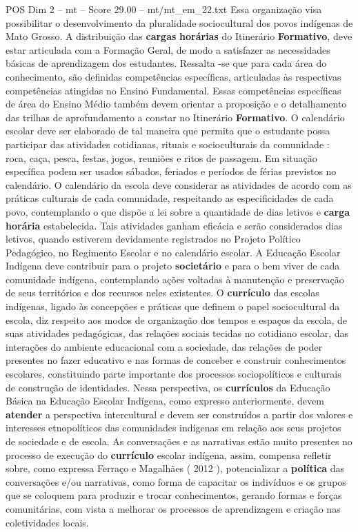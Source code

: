 \begin{textsample}{POS Dim 2 – mt – Score 29.00 – mt/mt\_em\_22.txt}
Essa organização visa possibilitar o desenvolvimento da pluralidade sociocultural dos povos indígenas de Mato Grosso.
A distribuição das \textbf{cargas} \textbf{horárias} do Itinerário \textbf{Formativo}, deve estar articulada com a Formação Geral, de modo a satisfazer as necessidades básicas de aprendizagem dos estudantes.
Ressalta -se que para cada área do conhecimento, são definidas competências específicas, articuladas às respectivas competências atingidas no Ensino Fundamental.
Essas competências específicas de área do Ensino Médio também devem orientar a proposição e o detalhamento das trilhas de aprofundamento a constar no Itinerário \textbf{Formativo}.
O calendário escolar deve ser elaborado de tal maneira que permita que o estudante possa participar das atividades cotidianas, rituais e socioculturais da comunidade : roca, caça, pesca, festas, jogos, reuniões e ritos de passagem.
Em situação específica podem ser usados sábados, feriados e períodos de férias previstos no calendário.
O calendário da escola deve considerar as atividades de acordo com as práticas culturais de cada comunidade, respeitando as especificidades de cada povo, contemplando o que dispõe a lei sobre a quantidade de dias letivos e \textbf{carga} \textbf{horária} estabelecida.
Tais atividades ganham eficácia e serão considerados dias letivos, quando estiverem devidamente registrados no Projeto Político Pedagógico, no Regimento Escolar e no calendário escolar.
A Educação Escolar Indígena deve contribuir para o projeto \textbf{societário} e para o bem viver de cada comunidade indígena, contemplando ações voltadas à manutenção e preservação de seus territórios e dos recursos neles existentes.
O \textbf{currículo} das escolas indígenas, ligado às concepções e práticas que definem o papel sociocultural da escola, diz respeito aos modos de organização dos tempos e espaços da escola, de suas atividades pedagógicas, das relações sociais tecidas no cotidiano escolar, das interações do ambiente educacional com a sociedade, das relações de poder presentes no fazer educativo e nas formas de conceber e construir conhecimentos escolares, constituindo parte importante dos processos sociopolíticos e culturais de construção de identidades.
Nessa perspectiva, os \textbf{currículos} da Educação Básica na Educação Escolar Indígena, como expresso anteriormente, devem \textbf{atender} a perspectiva intercultural e devem ser construídos a partir dos valores e interesses etnopolíticos das comunidades indígenas em relação aos seus projetos de sociedade e de escola.
As conversações e as narrativas estão muito presentes no processo de execução do \textbf{currículo} escolar indígena, assim, compensa refletir sobre, como expressa Ferraço e Magalhães ( 2012 ), potencializar a \textbf{política} das conversações e/ou narrativas, como forma de capacitar os indivíduos e os grupos que se coloquem para produzir e trocar conhecimentos, gerando formas e forças comunitárias, com vista a melhorar os processos de aprendizagem e criação nas coletividades locais.

\end{textsample}
